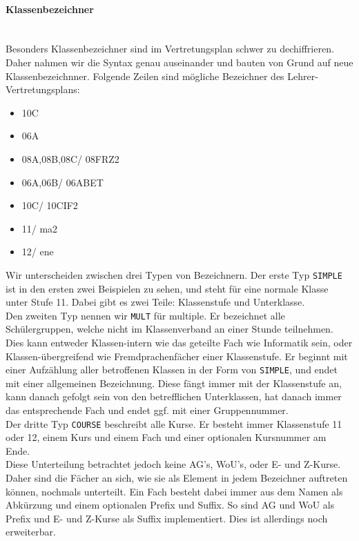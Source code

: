 \paragraph{Klassenbezeichner}\mbox{}\\
Besonders Klassenbezeichner sind im Vertretungsplan schwer zu dechiffrieren. Daher nahmen wir die Syntax
genau auseinander und bauten von Grund auf neue Klassenbezeichnner. Folgende Zeilen sind mögliche Bezeichner
des Lehrer-Vertretungsplans:
\begin{itemize}[itemsep=0pt]
	\ttfamily
	\item[] 10C
	\item[] 06A
	\item[] 08A,08B,08C/ 08FRZ2
	\item[] 06A,06B/ 06ABET
	\item[] 10C/ 10CIF2
	\item[] 11/ ma2
	\item[] 12/ ene
\end{itemize}
Wir unterscheiden zwischen drei Typen von Bezeichnern. Der erste Typ \glqq\texttt{SIMPLE}\grqq{} ist in den ersten zwei
Beispielen zu sehen, und steht für eine normale Klasse unter Stufe 11. Dabei gibt es zwei Teile: Klassenstufe und
Unterklasse.\\ %
Den zweiten Typ nennen wir \glqq\texttt{MULT}\grqq{} für \glqq multiple\grqq{}. Er bezeichnet alle Schülergruppen,
welche nicht im Klassenverband an einer Stunde teilnehmen. Dies kann entweder Klassen-intern wie das geteilte Fach
wie Informatik sein, oder Klassen-übergreifend wie Fremdprachenfächer einer Klassenstufe. Er beginnt mit einer
Aufzählung aller betroffenen Klassen in der Form von \texttt{SIMPLE}, und endet mit einer allgemeinen Bezeichnung.
Diese fängt immer mit der Klassenstufe an, kann danach gefolgt sein von den betrefflichen Unterklassen, hat danach
immer das entsprechende Fach und endet ggf. mit einer Gruppennummer. \\
Der dritte Typ \glqq\texttt{COURSE}\grqq{} beschreibt alle Kurse. Er besteht immer Klassenstufe 11 oder 12, einem
Kurs und einem Fach und einer optionalen Kursnummer am Ende.\\
Diese Unterteilung betrachtet jedoch keine AG's, WoU's, oder E- und Z-Kurse. Daher sind die Fächer an sich, wie sie
als Element in jedem Bezeichner auftreten können, nochmals unterteilt. Ein Fach besteht dabei immer aus dem Namen
als Abkürzung und einem optionalen Prefix und Suffix. So sind AG und WoU als Prefix und E- und Z-Kurse als Suffix
implementiert. Dies ist allerdings noch erweiterbar.

